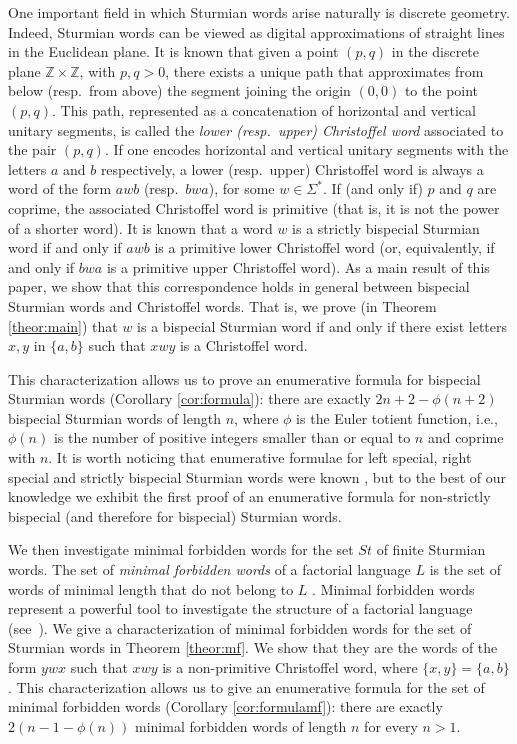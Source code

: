 \documentclass{llncs}
\newcommand{\St}{\textit{St}}
\begin{document}
One important field in which Sturmian words arise naturally is discrete geometry. Indeed, Sturmian words can be viewed as digital approximations of straight lines in the Euclidean plane. It is known that given a point $(p,q)$ in the discrete plane $\mathbb{Z} \times \mathbb{Z}$, with $p,q>0$, there exists a unique path that approximates from below (resp.~from above) the segment joining the origin $(0,0)$ to the point $(p,q)$. This path, represented as a concatenation of horizontal and vertical unitary segments, is called the \emph{lower (resp.~upper) Christoffel word} associated to the pair $(p,q)$. If one encodes horizontal and vertical unitary segments with the letters $a$ and $b$ respectively, a lower (resp.~upper) Christoffel word is always a word of the form $awb$ (resp.~$bwa$), for some $w\in \Sigma^{*}$. If (and only if) $p$ and $q$ are coprime, the associated Christoffel word is primitive (that is, it is not the power of a shorter word). It is known that a word $w$ is a strictly bispecial Sturmian word if and only if $awb$ is a primitive lower Christoffel word (or, equivalently, if and only if $bwa$ is a primitive upper Christoffel word). As a main result of this paper, we show that this correspondence holds in general between bispecial Sturmian words and Christoffel words. That is, we prove (in Theorem \ref{theor:main}) that $w$ is a bispecial Sturmian word if and only if there exist letters $x,y$ in $\{a,b\}$ such that $xwy$ is a Christoffel word. 

This characterization allows us to prove an enumerative formula for bispecial Sturmian words (Corollary \ref{cor:formula}): there are exactly $2n+2-\phi(n+2)$ bispecial Sturmian words of length $n$, where $\phi$ is the Euler totient function, i.e., $\phi(n)$ is the number of positive integers smaller than or equal to $n$ and coprime with $n$. It is worth noticing that enumerative formulae for left special, right special and strictly bispecial Sturmian words were known \cite{DelMi94}, but to the best of our knowledge we exhibit the first proof of an enumerative formula for non-strictly bispecial (and therefore for bispecial) Sturmian words.

We then investigate minimal forbidden words for the set $\St$ of finite Sturmian words. The set of \emph{minimal forbidden words} of a factorial language $L$ is the set of words of minimal length that do not belong to $L$ \cite{MiReSci02}. Minimal forbidden words represent a powerful tool to investigate the structure of a factorial language (see~\cite{BeMiRe96}).
We give a characterization of minimal forbidden words for the set of Sturmian words in Theorem \ref{theor:mf}. We show that they are the words of the form $ywx$ such that $xwy$ is a non-primitive Christoffel word, where $\{x,y\}=\{a,b\}$. This characterization allows us to give an enumerative formula for the set of minimal forbidden words (Corollary \ref{cor:formulamf}):  there are exactly $2(n-1-\phi(n))$ minimal forbidden words of length $n$ for every $n>1$.
\end{document}
